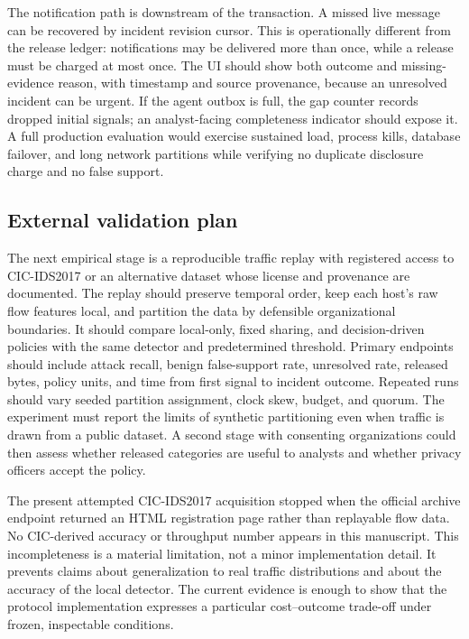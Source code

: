 \documentclass[conference,letterpaper]{IEEEtran}
\begin{document}
The notification path is downstream of the transaction. A missed live message can be recovered by incident revision cursor. This is operationally different from the release ledger: notifications may be delivered more than once, while a release must be charged at most once. The UI should show both outcome and missing-evidence reason, with timestamp and source provenance, because an unresolved incident can be urgent. If the agent outbox is full, the gap counter records dropped initial signals; an analyst-facing completeness indicator should expose it. A full production evaluation would exercise sustained load, process kills, database failover, and long network partitions while verifying no duplicate disclosure charge and no false support.

\subsection{External validation plan}
The next empirical stage is a reproducible traffic replay with registered access to CIC-IDS2017 or an alternative dataset whose license and provenance are documented. The replay should preserve temporal order, keep each host's raw flow features local, and partition the data by defensible organizational boundaries. It should compare local-only, fixed sharing, and decision-driven policies with the same detector and predetermined threshold. Primary endpoints should include attack recall, benign false-support rate, unresolved rate, released bytes, policy units, and time from first signal to incident outcome. Repeated runs should vary seeded partition assignment, clock skew, budget, and quorum. The experiment must report the limits of synthetic partitioning even when traffic is drawn from a public dataset. A second stage with consenting organizations could then assess whether released categories are useful to analysts and whether privacy officers accept the policy.

The present attempted CIC-IDS2017 acquisition stopped when the official archive endpoint returned an HTML registration page rather than replayable flow data. No CIC-derived accuracy or throughput number appears in this manuscript. This incompleteness is a material limitation, not a minor implementation detail. It prevents claims about generalization to real traffic distributions and about the accuracy of the local detector. The current evidence is enough to show that the protocol implementation expresses a particular cost--outcome trade-off under frozen, inspectable conditions.
\end{document}
